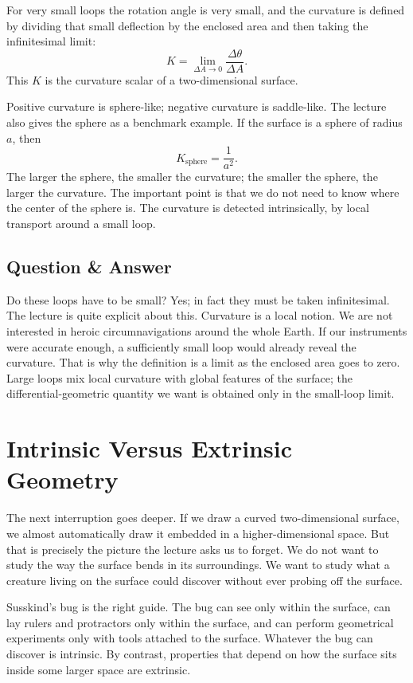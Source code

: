 For very small loops the rotation angle is very small, and the curvature is defined by dividing that small deflection by the enclosed area and then taking the infinitesimal limit:
\begin{equation}
K=\lim_{\Delta A\to 0}\frac{\Delta\theta}{\Delta A}.
\end{equation}
This \(K\) is the curvature scalar of a two-dimensional surface.

Positive curvature is sphere-like; negative curvature is saddle-like. The lecture also gives the sphere as a benchmark example. If the surface is a sphere of radius \(a\), then
\begin{equation}
K_{\text{sphere}}=\frac{1}{a^2}.
\end{equation}
The larger the sphere, the smaller the curvature; the smaller the sphere, the larger the curvature. The important point is that we do not need to know where the center of the sphere is. The curvature is detected intrinsically, by local transport around a small loop.

\subsection{Question \& Answer}

Do these loops have to be small? Yes; in fact they must be taken infinitesimal. The lecture is quite explicit about this. Curvature is a local notion. We are not interested in heroic circumnavigations around the whole Earth. If our instruments were accurate enough, a sufficiently small loop would already reveal the curvature. That is why the definition is a limit as the enclosed area goes to zero. Large loops mix local curvature with global features of the surface; the differential-geometric quantity we want is obtained only in the small-loop limit.

\section{Intrinsic Versus Extrinsic Geometry}

The next interruption goes deeper. If we draw a curved two-dimensional surface, we almost automatically draw it embedded in a higher-dimensional space. But that is precisely the picture the lecture asks us to forget. We do not want to study the way the surface bends in its surroundings. We want to study what a creature living on the surface could discover without ever probing off the surface.

Susskind's bug is the right guide. The bug can see only within the surface, can lay rulers and protractors only within the surface, and can perform geometrical experiments only with tools attached to the surface. Whatever the bug can discover is intrinsic. By contrast, properties that depend on how the surface sits inside some larger space are extrinsic.

